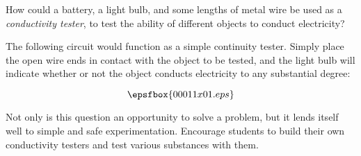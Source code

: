 

How could a battery, a light bulb, and some lengths of metal wire be used as a {\it conductivity tester}, to test the ability of different objects to conduct electricity?







The following circuit would function as a simple continuity tester.  Simply place the open wire ends in contact with the object to be tested, and the light bulb will indicate whether or not the object conducts electricity to any substantial degree:

$$\epsfbox{00011x01.eps}$$







Not only is this question an opportunity to solve a problem, but it lends itself well to simple and safe experimentation.  Encourage students to build their own conductivity testers and test various substances with them.




